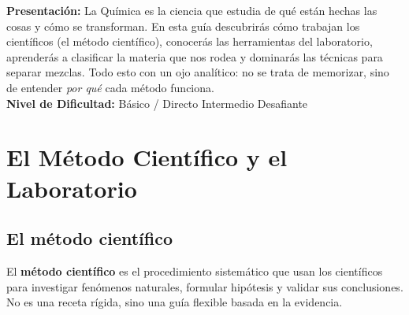 \documentclass[12pt, letterpaper]{article}
\begin{document}


\vspace{4pt}
\begin{cuadroinfo}
  \small
  \textbf{Presentación:} La Química es la ciencia que estudia de qué están hechas las cosas y cómo se transforman. En esta guía descubrirás cómo trabajan los científicos (el método científico), conocerás las herramientas del laboratorio, aprenderás a clasificar la materia que nos rodea y dominarás las técnicas para separar mezclas. Todo esto con un ojo analítico: no se trata de memorizar, sino de entender \emph{por qué} cada método funciona.
  \\[4pt]
  \textbf{Nivel de Dificultad:}\quad
  \facil{} Básico / Directo \quad
  \medio{} Intermedio \quad
  \dificil{} Desafiante
\end{cuadroinfo}

\vspace{2pt}

\section{El Método Científico y el Laboratorio}

\subsection{El método científico}

El \textbf{método científico} es el procedimiento sistemático que usan los científicos para investigar fenómenos naturales, formular hipótesis y validar sus conclusiones. No es una receta rígida, sino una guía flexible basada en la evidencia.
\end{document}
